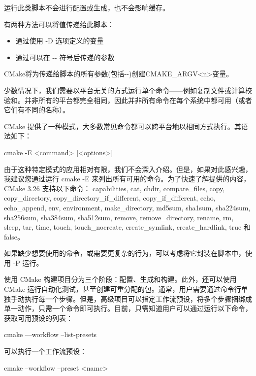 运行此类脚本不会进行配置或生成，也不会影响缓存。

有两种方法可以将值传递给此脚本：

\begin{itemize}
\item
通过使用 -D 选项定义的变量

\item
通过可以在 -{}- 符号后传递的参数
\end{itemize}

CMake将为传递给脚本的所有参数(包括-{}-)创建CMAKE\_ARGV<n>变量。


少数情况下，我们需要以平台无关的方式运行单个命令——例如复制文件或计算校验和。并非所有的平台都完全相同，因此并非所有命令在每个系统中都可用（或者它们有不同的名称）。

CMake 提供了一种模式，大多数常见命令都可以跨平台地以相同方式执行。其语法如下：

\begin{shell}
cmake -E <command> [<options>]
\end{shell}

由于这种特定模式的应用相对有限，我们不会深入介绍。但是，如果对此感兴趣，我建议您通过运行 cmake -E 来列出所有可用的命令。为了快速了解提供的内容，CMake 3.26 支持以下命令： capabilities, cat, chdir, compare\_files, copy, copy\_directory, copy\_directory\_if\_different, copy\_if\_different, echo, echo\_append, env, environment, make\_directory, md5sum, sha1sum, sha224sum, sha256sum, sha384sum, sha512sum, remove, remove\_directory, rename, rm, sleep, tar, time, touch, touch\_nocreate, create\_symlink, create\_hardlink, true 和 false。

如果缺少想要使用的命令，或需要更复杂的行为，可以考虑将它封装在脚本中，使用 -P 运行。


使用 CMake 构建项目分为三个阶段：配置、生成和构建。此外，还可以使用 CMake 运行自动化测试，甚至创建可重分配的包。通常，用户需要通过命令行单独手动执行每一个步骤。但是，高级项目可以指定工作流预设，将多个步骤捆绑成单一动作，只需一个命令即可执行。目前，只需知道用户可以通过运行以下命令，获取可用预设的列表：

\begin{shell}
cmake ––workflow --list-presets
\end{shell}

可以执行一个工作流预设：

\begin{shell}
cmake --workflow --preset <name>
\end{shell}

